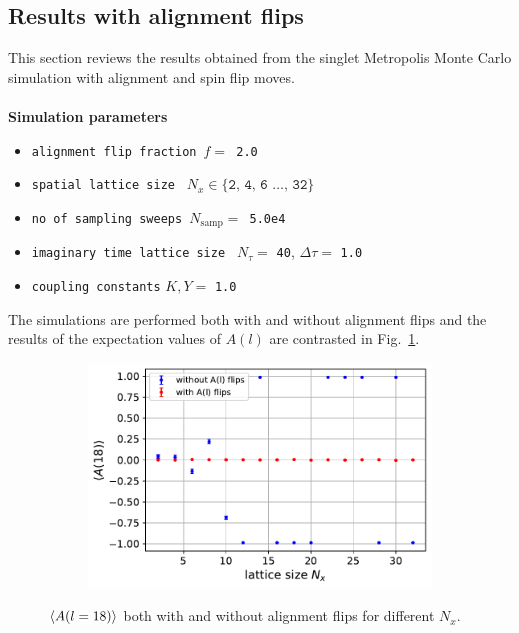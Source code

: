 \documentclass[../thesis_main.tex]{subfiles}
\begin{document}
\subsection{Results with alignment flips}
This section reviews the results obtained from the singlet Metropolis Monte Carlo simulation with alignment and spin flip moves.~\\~\\
\textbf{Simulation parameters}
\begin{itemize}[label={}]
    \setlength{\itemsep}{0.1em}
    \item \texttt{alignment flip fraction $f = $ 2.0}
    \item \texttt{spatial lattice size } $N_x \in \{ \texttt{2, 4, 6 $\ldots$, 32} \}$  
    \item \texttt{no of sampling sweeps $N_\text{samp} = $ 5.0e4} 
    \item \texttt{imaginary time lattice size } $N_\tau = $ \texttt{40}, \: $\Delta \tau = $ \texttt{1.0}
    \item \texttt{coupling constants} $K, Y = $ \texttt{1.0} 
\end{itemize}
The simulations are performed both with and without alignment flips and the results of the expectation values of $A(l)$ are contrasted in Fig.~\ref{alignflipexpval}. 
\begin{figure}[!htb]
    \centering
    \begin{subfigure}[b]{0.55\textwidth}
        \centering
        \includegraphics[width=\textwidth]{images/fix_subsystem_symmetry/expval(A(l)) vs N_x (l=18) with and without aflips.pdf}
    \end{subfigure}
    \caption{$\expval{A(l = 18)}$ both with and without alignment flips for different $N_x$.}
    \label{alignflipexpval}
\end{figure}
\end{document}
